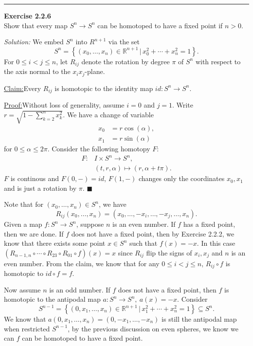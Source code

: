 \documentclass[a4paper, 12pt]{article}
\newenvironment{problem}[2][Exercise]
    { \begin{mdframed}[backgroundcolor=gray!20] \textbf{#1 #2} \\}
    {  \end{mdframed}}
\newenvironment{solution}
    {\textit{Solution:}}
    {}
\newenvironment{claim}[1]{\par\noindent\underline{Claim:}\space#1}{}
\newenvironment{claimproof}[1]{\par\noindent\underline{Proof:}\space#1}{\hfill $\blacksquare$}
\begin{document}
\noindent\rule{7in}{2.8pt}
\begin{problem}{2.2.6}
Show that every map \(S^n\rightarrow S^n\) can be homotoped to have a fixed point if \(n>0\).
\end{problem}
\begin{solution}
We embed \(S^n\) into \(R^{n+1}\) via the set 
\[S^n=\left\{ (x_0,\ldots,x_n)\in \mathbb{R}^{n+1}\,|\, x_0^2+\cdots+x_n^2=1 \right\}.\]
For \(0\leq i<j\leq n\), let \(R_{ij}\) denote the rotation by degree \(\pi\) of \(S^n\) with respect to the axis normal to the \(x_ix_j\)-plane.

\begin{claim}
Every \(R_{ij}\) is homotopic to the identity map \(id:S^n\rightarrow S^n\).
\end{claim}
\begin{claimproof}
Without loss of generality, assume \(i=0\) and \(j=1\). Write \(r=\sqrt{1-\sum_{k=2}^{n} x_k^2}\). We have a change of variable
\begin{align*}
    x_0& =r\cos (\alpha),\\ 
    x_1& =r\sin (\alpha)
\end{align*}
for \(0\leq \alpha\leq 2\pi\). Consider the following homotopy \(F\):
\begin{align*}
    F:&I\times S^n\rightarrow S^n,\\ 
    &(t,r,\alpha)\mapsto (r,\alpha+t\pi).
\end{align*}
\(F\) is continous and \(F(0,-)=id\), \(F(1,-)\) changes only the coordinates \(x_0,x_1\) and is just a rotation by \(\pi\).
\end{claimproof}

Note that for \((x_0,\ldots,x_n)\in S^n\), we have 
\[R_{ij}(x_0,\ldots,x_n)=(x_0,\ldots,-x_i,\ldots,-x_j,\ldots,x_n).\]
Given a map \(f:S^n\rightarrow S^n\), suppose \(n\) is an even number. If \(f\) has a fixed point, then we are done. If \(f\) does not have a fixed point, then by Exercise 2.2.2, we know that there exists some point 
\(x\in S^n\) such that \(f(x)=-x\). In this case \((R_{n-1,n}\circ \cdots\circ R_{23}\circ R_{01}\circ f)(x)=x\) since \(R_{ij}\) flip the signs of \(x_i,x_j\) and \(n\) is an even number. From the claim, we know that 
for any \(0\leq i<j\leq n\), \(R_{ij}\circ f\) is homotopic to \(id\circ f=f\).

Now assume \(n\) is an odd number. If \(f\) does not have a fixed point, then \(f\) is homotopic to the antipodal map \(a:S^n\rightarrow S^n,\  a(x)=-x\). Consider 
\[S^{n-1}=\left\{ (0,x_1,\ldots,x_n)\in \mathbb{R}^{n+1}\,|\, x_1^2+\cdots+x_n^2=1 \right\}\subseteq S^n.\]
We know that \(a(0,x_1,\ldots,x_n)=(0,-x_1,\ldots,-x_n)\) is still the antipodal map when restricted \(S^{n-1}\), by the previous discussion on even spheres, we know we can \(f\) can be homotoped to have a fixed point.
\end{solution}
\end{document}
